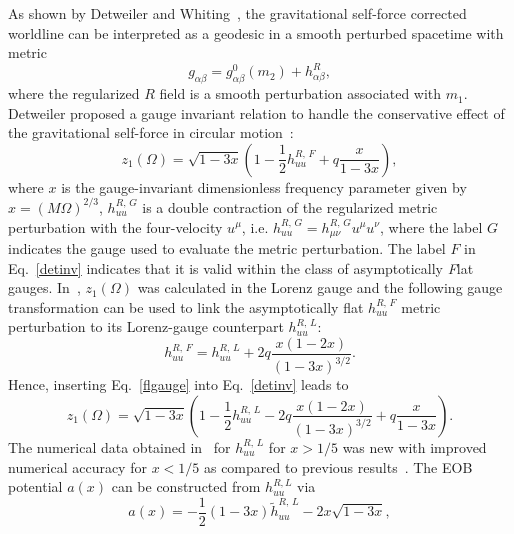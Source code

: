 As shown by Detweiler and Whiting~\cite{Detweiler:2003}, the gravitational self-force corrected worldline can be interpreted as a  geodesic in a smooth perturbed spacetime with metric
 \begin{equation}
 g_{\alpha \beta} =  g^{0}_{\alpha \beta}(m_2) + h^{R}_{\alpha \beta},
 \label{detint}
 \end{equation}
 \noindent where the regularized \(R\) field is a smooth perturbation associated with \(m_1\).
 Detweiler proposed a gauge invariant relation to handle the conservative effect of
 the gravitational self-force in circular motion~\cite{Detweiler:2008,Detweiler:2009}:
 \begin{equation}
z_1(\Omega)= \sqrt{1-3x}\left(1- \frac{1}{2} h^{R,\,F}_{uu} + q \frac{x}{1-3x}\right),
\label{detinv}
\end{equation}
\noindent where  \(x\) is the gauge-invariant dimensionless frequency parameter 
given by \(x=\left(M \Omega\right)^{2/3}\), \(h^{R,\,G}_{uu}\) is a double
contraction of the regularized metric perturbation with the four-velocity
\(u^{\mu}\), i.e. \( h^{R,\, G}_{uu} = h^{R,\,G}_{\mu\nu}u^{\mu} u^{\nu} \), 
where the label \(G\) indicates the gauge used to evaluate the metric perturbation.
The label \(F\) in Eq.~\ref{detinv} indicates that it is valid within the class 
of asymptotically {\it F}lat gauges.
In~\cite{Akcay:2012}, \(z_1(\Omega)\) was calculated in the Lorenz gauge and the 
following gauge transformation can be used to link the asymptotically flat 
\(h^{R,\,F}_{uu} \) metric perturbation to its Lorenz-gauge counterpart 
\(h^{R,\,L}_{uu} \):
\begin{equation}
h^{R,\,F}_{uu} = h^{R,\,L}_{uu} + 2q\frac{x(1-2x)}{\left(1-3x\right)^{3/2}}.
\label{flgauge}
\end{equation}
\noindent  Hence, inserting Eq.~\eqref{flgauge} into Eq.~\eqref{detinv} leads to
 \begin{equation}
z_1(\Omega)= \sqrt{1-3x}\left(1- \frac{1}{2} h^{R,\,L}_{uu}  - 2q\frac{x(1-2x)}{\left(1-3x\right)^{3/2}} + q \frac{x}{1-3x}\right).
\label{detinvLOR}
\end{equation}
The numerical data obtained in~\cite{Akcay:2012} for 
\(h^{R,\,L}_{uu} \) for \(x>1/5\) was new with improved numerical accuracy for
\(x<1/5\) as compared to previous results~\cite{Detweiler:2008,baracknewphi}.
The EOB potential \(a(x)\) can be constructed from $h_{uu}^{R,L}$ via
\begin{equation}
 a(x) = -\frac{1}{2}\left(1-3x\right)\tilde{h}^{R,\,L}_{uu} - 2x \sqrt{1-3x},
 \label{formal_a}
 \end{equation}
